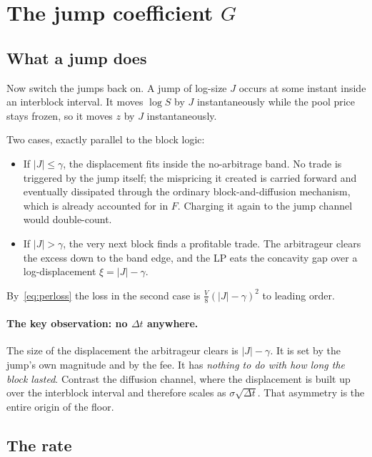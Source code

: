 \documentclass[11pt]{article}
\theoremstyle{definition}
\theoremstyle{remark}
\newcommand{\dt}{\Delta t}
\newcommand{\1}{\mathbf{1}}
\begin{document}
\section{The jump coefficient \texorpdfstring{$G$}{G}}\label{sec:G}

\subsection{What a jump does}

Now switch the jumps back on. A jump of log-size $J$ occurs at some instant inside an interblock interval. It moves $\log S$ by $J$ instantaneously while the pool price stays frozen, so it moves $z$ by $J$ instantaneously.

Two cases, exactly parallel to the block logic:
\begin{itemize}[leftmargin=2em]
\item If $|J| \le \gamma$, the displacement fits inside the no-arbitrage band. No trade is triggered by the jump itself; the mispricing it created is carried forward and eventually dissipated through the ordinary block-and-diffusion mechanism, which is already accounted for in $F$. Charging it again to the jump channel would double-count.
\item If $|J| > \gamma$, the very next block finds a profitable trade. The arbitrageur clears the excess down to the band edge, and the LP eats the concavity gap over a log-displacement $\xi = |J| - \gamma$.
\end{itemize}

By~\eqref{eq:perloss} the loss in the second case is $\tfrac{V}{8}(|J|-\gamma)^2$ to leading order.

\paragraph{The key observation: no $\dt$ anywhere.} The size of the displacement the arbitrageur clears is $|J| - \gamma$. It is set by the jump's own magnitude and by the fee. It has \emph{nothing to do with how long the block lasted}. Contrast the diffusion channel, where the displacement is built up over the interblock interval and therefore scales as $\sigma\sqrt{\dt}$. That asymmetry is the entire origin of the floor.

\subsection{The rate}
\end{document}
